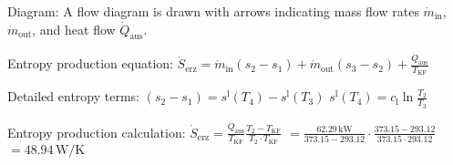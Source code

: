 Diagram: A flow diagram is drawn with arrows indicating mass flow rates \( \dot{m}_{\text{in}} \), \( \dot{m}_{\text{out}} \), and heat flow \( \dot{Q}_{\text{aus}} \).  

Entropy production equation:  
\( \dot{S}_{\text{erz}} = \dot{m}_{\text{in}} (s_2 - s_1) + \dot{m}_{\text{out}} (s_3 - s_2) + \frac{\dot{Q}_{\text{aus}}}{T_{\text{KF}}} \)  

Detailed entropy terms:  
\( (s_2 - s_1) = s^{\text{l}}(T_4) - s^{\text{l}}(T_3) \)  
\( s^{\text{l}}(T_4) = c_{\text{l}} \ln \frac{T_2}{T_3} \)  

Entropy production calculation:  
\( \dot{S}_{\text{erz}} = \frac{\dot{Q}_{\text{aus}}}{T_{\text{KF}}} \frac{T_2 - T_{\text{KF}}}{T_2 \cdot T_{\text{KF}}} \)  
\( = \frac{62.29 \, \text{kW}}{373.15 - 293.12} \cdot \frac{373.15 - 293.12}{373.15 \cdot 293.12} \)  
\( = 48.94 \, \text{W/K} \)